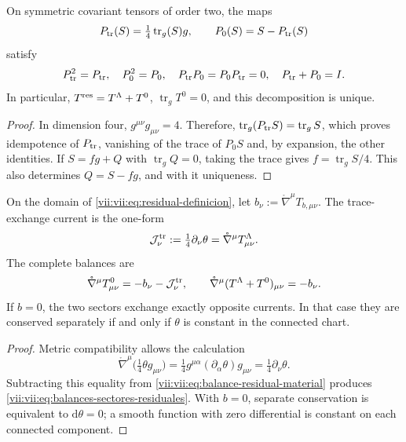 \begin{proposition}
\label{vii:vii:prop:proyectores-traza-residual}
On symmetric covariant tensors of order two, the maps
\[
 P_{\rm tr}(S)=\tfrac14\operatorname{tr}_g(S)g,
 \qquad P_0(S)=S-P_{\rm tr}(S)
\]
satisfy
\begin{equation}
 P_{\rm tr}^2=P_{\rm tr},\quad P_0^2=P_0,\quad
 P_{\rm tr}P_0=P_0P_{\rm tr}=0,\quad P_{\rm tr}+P_0=I.
 \label{vii:vii:eq:proyectores-traza-residual}
\end{equation}
In particular, \(T^{\rm res}=T^\Lambda+T^0\),
\(\operatorname{tr}_gT^0=0\), and this decomposition is unique.
\end{proposition}
\begin{proof}
In dimension four, \(g^{\mu\nu}g_{\mu\nu}=4\). Therefore,
\(\operatorname{tr}_g(P_{\rm tr}S)=\operatorname{tr}_gS\), which
proves idempotence of \(P_{\rm tr}\), vanishing of the trace
of \(P_0S\) and, by expansion, the other identities.
If \(S=fg+Q\) with \(\operatorname{tr}_gQ=0\), taking the trace
gives \(f=\operatorname{tr}_gS/4\). This also determines
\(Q=S-fg\), and with it uniqueness.
\end{proof}

\begin{theorem}
\label{vii:vii:thm:intercambio-traza-residual}
On the domain of \eqref{vii:vii:eq:residual-definicion}, let
\(b_\nu:=\mathring\nabla^\mu T_{b,\mu\nu}\). The trace-exchange
current is the one-form
\begin{equation}
 \mathcal J^{\rm tr}_\nu
 :=\tfrac14\partial_\nu\theta
 =\mathring\nabla^\mu T^\Lambda_{\mu\nu}.
 \label{vii:vii:eq:corriente-intercambio-traza}
\end{equation}
The complete balances are
\begin{equation}
 \mathring\nabla^\mu T^0_{\mu\nu}
       =-b_\nu-\mathcal J^{\rm tr}_\nu,
 \qquad
 \mathring\nabla^\mu(T^\Lambda+T^0)_{\mu\nu}=-b_\nu.
 \label{vii:vii:eq:balances-sectores-residuales}
\end{equation}
If \(b=0\), the two sectors exchange exactly opposite currents.
In that case they are conserved separately if and only if \(\theta\) is
constant in the connected chart.
\end{theorem}
\begin{proof}
Metric compatibility allows the calculation
\[
 \mathring\nabla^\mu\bigl(\tfrac14\theta g_{\mu\nu}\bigr)
 =\tfrac14g^{\mu\alpha}(\partial_\alpha\theta)g_{\mu\nu}
 =\tfrac14\partial_\nu\theta.
\]
Subtracting this equality from \eqref{vii:vii:eq:balance-residual-material} produces
\eqref{vii:vii:eq:balances-sectores-residuales}. With \(b=0\), separate
conservation is equivalent to \(\mathrm d\theta=0\); a smooth
function with zero differential is constant on each connected component.
\end{proof}

